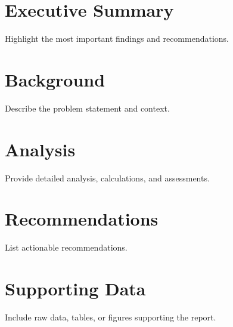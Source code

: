 \documentclass[
    language=english,
    doctype=technical-report,
    institution=none,
    titlestyle=book,
    oneside,
]{../../omnilatex}
\begin{document}
\maketitle

\tableofcontents

\chapter{Executive Summary}
Highlight the most important findings and recommendations.

\chapter{Background}
Describe the problem statement and context.

\chapter{Analysis}
Provide detailed analysis, calculations, and assessments.

\chapter{Recommendations}
List actionable recommendations.

\appendix
\chapter{Supporting Data}
Include raw data, tables, or figures supporting the report.
\end{document}
